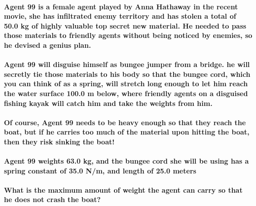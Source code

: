\paragraph{Agent 99 is a female agent played by Anna Hathaway in the recent movie, she has infiltrated enemy territory and has stolen a total of 50.0 kg of highly valuable top secret new material. He needed to pass those materials to friendly agents without being noticed by enemies, so he devised a genius plan.\newline}
\paragraph{Agent 99 will disguise himself as bungee jumper from a bridge. he will secretly tie those materials to his body so that the bungee cord, which you can think of as a spring, will stretch long enough to let him reach the water surface 100.0 m below, where friendly agents on a disguised fishing kayak will catch him and take the weights from him.
\newline}
\paragraph{Of course, Agent 99 needs to be heavy enough so that they reach the boat, but if he carries too much of the material upon hitting the boat, then they risk sinking the boat!\newline}
\paragraph{Agent 99 weights 63.0 kg, and the bungee cord she will be using has a spring constant of 35.0 N/m, and length of 25.0 meters\newline}

\paragraph{What is the maximum amount of weight the agent can carry so that he does not crash the boat?\newline}

